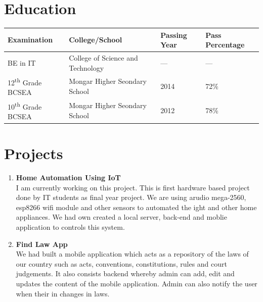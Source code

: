 \documentclass[10pt]{article}
\begin{document}
	\section{Education}
	\begin{center}  
		\begin{tabular}{ | l | l | l | l |}
			\hline
			\textbf{Examination} & \textbf{College/School}  & \textbf{Passing Year} & \textbf{Pass Percentage}\\ \hline
			BE in IT &College of Science and Technology &---\- & ---\-\\ \hline
			12\textsuperscript{th} Grade BCSEA & Mongar Higher Seondary School & 2014 & 72\% \\ \hline
			10\textsuperscript{th} Grade BCSEA & Mongar Higher Seondary School & 2012 & 78\% \\ \hline
		\end{tabular}
	\end{center}

	\section{Projects}
	\begin{enumerate}
		\item {\bf Home Automation Using IoT}\\
		I am currently working on this project. This is first hardware based project done by IT students as final year project. We are using arudio mega-2560, esp8266 wifi module and other sensors to automated the ight and other home appliances. We had own created a local server, back-end and moblie application to controls this system.
		\item {\bf Find Law App}\\
		We had built a mobile application which acts as a repository of the laws of our country such as acts, conventions, constitutions, rules and court judgements. It also consists backend whereby admin can add, edit and updates the content of the mobile application. Admin can also notify the user when their in changes in laws.
	
	\end{enumerate}
 
\end{document}
